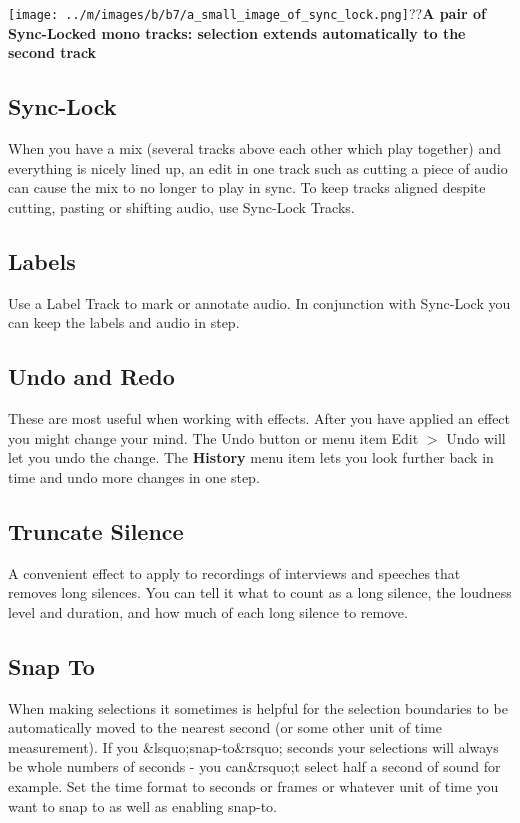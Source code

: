 \documentclass[twocolumn]{book}
\begin{document}
\par\texttt{[image: ../m/images/b/b7/a\_small\_image\_of\_sync\_lock.png]}??\textbf{A pair of Sync-Locked mono tracks: selection extends automatically to the second track}

\subsection{Sync-Lock}


When you have a mix (several tracks above each other which play together) and everything is nicely lined up, an edit in one track such as cutting a piece of audio can cause the mix to no longer to play in sync. To keep tracks aligned despite cutting, pasting or shifting audio, use Sync-Lock Tracks.

\subsection{Labels}


Use a Label Track to mark or annotate audio.  In conjunction with Sync-Lock you can keep the labels and audio in step.

\subsection{Undo and Redo}


These are most useful when working with effects.  After you have applied an effect you might change your mind.  The Undo button or menu item Edit \mbox{$>$} Undo will let you undo the change. The \textbf{History} menu item lets you look further back in time and undo more changes in one step.

\subsection{Truncate Silence}


A convenient effect to apply to recordings of interviews and speeches that removes long silences.  You can tell it what to count as a long silence, the loudness level and duration, and how much of each long silence to remove.

\subsection{Snap To}


When making selections it sometimes is helpful for the selection boundaries to be automatically moved to the nearest second (or some other unit of time measurement).  If you \&lsquo;snap-to\&rsquo; seconds your selections will always be whole numbers of seconds - you can\&rsquo;t select half a second of sound for example.  Set the time format to seconds or frames or whatever unit of time you want to snap to as well as enabling snap-to.
\end{document}
